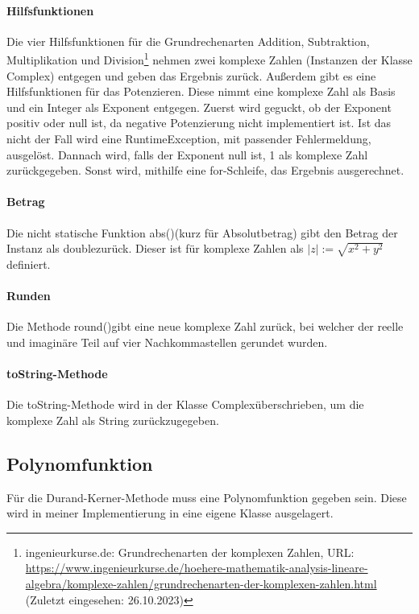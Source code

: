 \documentclass[12pt]{article}
\begin{document}
\paragraph{Hilfsfunktionen}
Die vier Hilfsfunktionen für die Grundrechenarten Addition, Subtraktion, Multiplikation und Division\footnote{ingenieurkurse.de: Grundrechenarten der komplexen Zahlen, URL: \url{https://www.ingenieurkurse.de/hoehere-mathematik-analysis-lineare-algebra/komplexe-zahlen/grundrechenarten-der-komplexen-zahlen.html} (Zuletzt eingesehen: 26.10.2023)\label{ftn:grundrechenarten}} nehmen zwei komplexe Zahlen (Instanzen der Klasse \glqq Complex\grqq) entgegen und geben das Ergebnis zurück. 
Außerdem gibt es eine Hilfsfunktionen für das Potenzieren. Diese nimmt eine komplexe Zahl als Basis und ein Integer als Exponent entgegen. Zuerst wird geguckt, ob der Exponent positiv oder null ist, da negative Potenzierung nicht implementiert ist. Ist das nicht der Fall wird eine \glqq RuntimeException\grqq, mit passender Fehlermeldung, ausgelöst. Dannach wird, falls der Exponent null ist, 1 als komplexe Zahl zurückgegeben. Sonst wird, mithilfe eine \glqq for-Schleife\grqq, das Ergebnis ausgerechnet.

\paragraph{Betrag}
Die nicht statische Funktion \glqq abs()\grqq\space (kurz für Absolutbetrag) gibt den Betrag der Instanz als \glqq double\grqq\space zurück. Dieser ist für komplexe Zahlen als $|z| := \sqrt{x^2+y^2}$ definiert.

\paragraph{Runden}
Die Methode \glqq round()\grqq\space gibt eine neue komplexe Zahl zurück, bei welcher der reelle und imaginäre Teil auf vier Nachkommastellen gerundet wurden.

\paragraph{\glqq toString\grqq-Methode}
Die \glqq toString\grqq-Methode wird in der Klasse \glqq Complex\grqq\space überschrieben, um die komplexe Zahl als String zurückzugegeben.

\subsection{Polynomfunktion}
Für die Durand-Kerner-Methode muss eine Polynomfunktion gegeben sein. Diese wird in meiner Implementierung in eine eigene Klasse ausgelagert.
\end{document}
